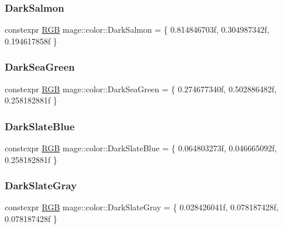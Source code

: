 \subsubsection{\texorpdfstring{Dark\+Salmon}{DarkSalmon}}
{\footnotesize\ttfamily constexpr \mbox{\hyperlink{structmage_1_1_r_g_b}{R\+GB}} mage\+::color\+::\+Dark\+Salmon = \{ 0.\+814846703f, 0.\+304987342f, 0.\+194617858f \}}

\mbox{\label{namespacemage_1_1color_a1e835bd8a981b6e1d26267e774b32c74}} 
\subsubsection{\texorpdfstring{Dark\+Sea\+Green}{DarkSeaGreen}}
{\footnotesize\ttfamily constexpr \mbox{\hyperlink{structmage_1_1_r_g_b}{R\+GB}} mage\+::color\+::\+Dark\+Sea\+Green = \{ 0.\+274677340f, 0.\+502886482f, 0.\+258182881f \}}

\mbox{\label{namespacemage_1_1color_a5dad9107a42e3b57733617d884850bce}} 
\subsubsection{\texorpdfstring{Dark\+Slate\+Blue}{DarkSlateBlue}}
{\footnotesize\ttfamily constexpr \mbox{\hyperlink{structmage_1_1_r_g_b}{R\+GB}} mage\+::color\+::\+Dark\+Slate\+Blue = \{ 0.\+064803273f, 0.\+046665092f, 0.\+258182881f \}}

\mbox{\label{namespacemage_1_1color_ac2267d00e970246ed57ab091410f3d0b}} 
\subsubsection{\texorpdfstring{Dark\+Slate\+Gray}{DarkSlateGray}}
{\footnotesize\ttfamily constexpr \mbox{\hyperlink{structmage_1_1_r_g_b}{R\+GB}} mage\+::color\+::\+Dark\+Slate\+Gray = \{ 0.\+028426041f, 0.\+078187428f, 0.\+078187428f \}}

